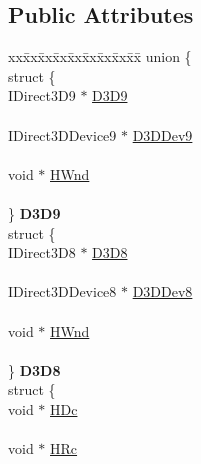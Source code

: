 \subsection*{Public Attributes}
\begin{DoxyCompactItemize}
\item 
\begin{tabbing}
xx\=xx\=xx\=xx\=xx\=xx\=xx\=xx\=xx\=\kill
union \{\\
\>struct \{\\
\>\>IDirect3D9 $\ast$ \hyperlink{structirr_1_1video_1_1SExposedVideoData_a67c07a7b5197dcbcdbc5b952f9c24251}{D3D9}\\
\>\>\\
\>\>IDirect3DDevice9 $\ast$ \hyperlink{structirr_1_1video_1_1SExposedVideoData_acb2bcad132f9aa57278a1c61df5cdf3c}{D3DDev9}\\
\>\>\\
\>\>void $\ast$ \hyperlink{structirr_1_1video_1_1SExposedVideoData_a1811289f08d71ca61b6b88b765753b88}{HWnd}\\
\>\>\\
\>\} {\bfseries D3D9}\\
\>struct \{\\
\>\>IDirect3D8 $\ast$ \hyperlink{structirr_1_1video_1_1SExposedVideoData_a4af55cc4ac6d5d15371d1399d57284c8}{D3D8}\\
\>\>\\
\>\>IDirect3DDevice8 $\ast$ \hyperlink{structirr_1_1video_1_1SExposedVideoData_ae7b1a142e2f4ce4ad67cbd0073d4ec1d}{D3DDev8}\\
\>\>\\
\>\>void $\ast$ \hyperlink{structirr_1_1video_1_1SExposedVideoData_a1811289f08d71ca61b6b88b765753b88}{HWnd}\\
\>\>\\
\>\} {\bfseries D3D8}\\
\>struct \{\\
\>\>void $\ast$ \hyperlink{structirr_1_1video_1_1SExposedVideoData_ad7c4d919a8c0e17ee46577fcc69fe8e6}{HDc}\\
\>\>\\
\>\>void $\ast$ \hyperlink{structirr_1_1video_1_1SExposedVideoData_a02e3cb39affd68c68e0d2e416f078e13}{HRc}\\
\>\>\\

\end{tabbing}
\end{DoxyCompactItemize}
